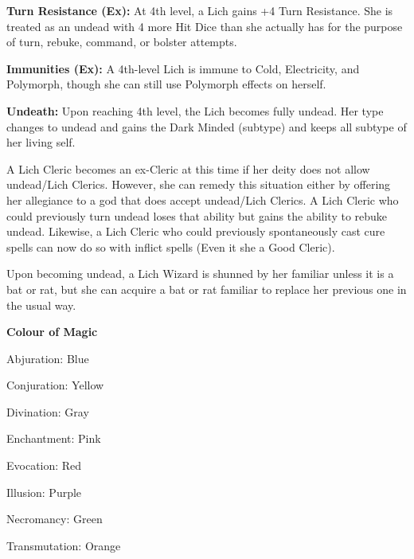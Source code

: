 \textbf{Turn Resistance (Ex):} At 4th level, a Lich gains +4 Turn Resistance. She is treated as an undead with 4 more Hit Dice than she actually has for the purpose of turn, rebuke, command, or bolster attempts.

\textbf{Immunities (Ex):} A 4th-level Lich is immune to Cold, Electricity, and Polymorph, though she can still use Polymorph effects on herself.

\textbf{Undeath:} Upon reaching 4th level, the Lich becomes fully undead. Her type changes to undead and gains the Dark Minded (subtype) and keeps all subtype of her living self.

A Lich Cleric becomes an ex-Cleric at this time if her deity does not allow undead/Lich Clerics. However, she can remedy this situation either by offering her allegiance to a god that does accept undead/Lich Clerics. A Lich Cleric who could previously turn undead loses that ability but gains the ability to rebuke undead. Likewise, a Lich Cleric who could previously spontaneously cast cure spells can now do so with inflict spells (Even it she a Good Cleric).

Upon becoming undead, a Lich Wizard is shunned by her familiar unless it is a bat or rat, but she can acquire a bat or rat familiar to replace her previous one in the usual way.				

\textbf{Colour of Magic}
\begin{itemize*}
	\item Abjuration: Blue
	\item Conjuration: Yellow
	\item Divination: Gray
	\item Enchantment: Pink
	\item Evocation: Red
	\item Illusion: Purple
	\item Necromancy: Green
	\item Transmutation: Orange
\end{itemize*}